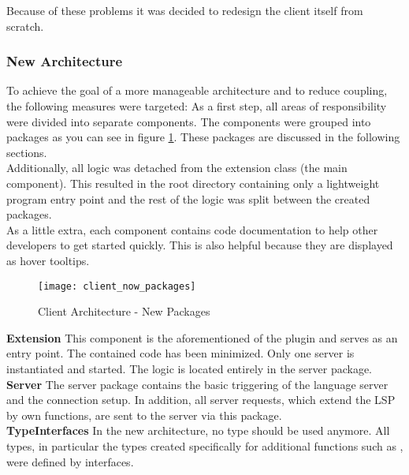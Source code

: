 Because of these problems it was decided to redesign the client itself from scratch.

\subsubsection{New Architecture}
To achieve the goal of a more manageable architecture and to reduce coupling, the following measures were targeted:
As a first step, all areas of responsibility were divided into separate components.
The components were grouped into packages as you can see in figure \ref{fig:client_now_packages}.
These packages are discussed in the following sections. \\

Additionally, all logic was detached from the extension class (the main component).
This resulted in the root directory containing only a lightweight program entry point
and the rest of the logic was split between the created packages. \\

As a little extra, each component contains code documentation to help other developers to get started quickly. This is also helpful because they are displayed as hover tooltips.


\begin{figure}[H]
    \centering
    \texttt{[image: client\_now\_packages]}
    \caption{Client Architecture - New Packages}
    \label{fig:client_now_packages}
\end{figure}

{\bf Extension} \textendash{}
This component is the aforementioned  of the plugin and serves as an entry point. The contained code has been minimized. Only one server is instantiated and started. The logic is located entirely in the server package. \\

{\bf Server} \textendash{}
The server package contains the basic triggering  of the language server and the connection setup. In addition, all server requests, which extend the LSP by own functions, are sent to the server via this package. \\

{\bf TypeInterfaces} \textendash{}
In the new architecture, no  type should be used anymore. All types, in particular the types created specifically for additional functions such as , were defined by interfaces. \\

